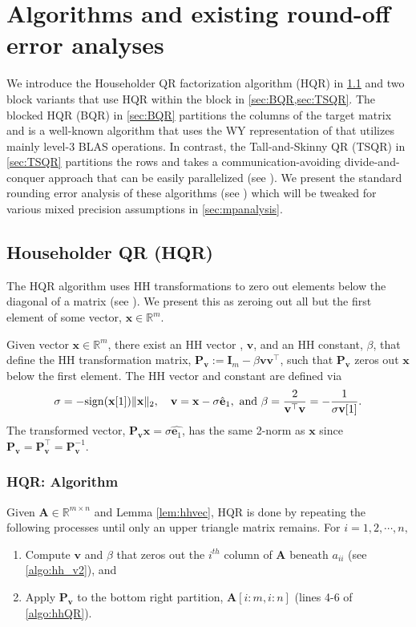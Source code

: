 \documentclass[review,onefignum,onetabnum]{siamart190516}
\newcommand{\R}{\mathbb{R}}
\newcommand{\bb}[1]{\mathbf{#1}}
\begin{document}
\section{Algorithms and existing round-off error analyses}\label{sec:algo}
%
We introduce the Householder QR factorization algorithm (HQR) in \cref{sec:HQR} and two block variants that use HQR within the block in \cref{sec:BQR,sec:TSQR}. 
The blocked HQR (BQR) in \cref{sec:BQR} partitions the columns of the target matrix and is a well-known algorithm that uses the WY representation of \cite{Bischof1987} that utilizes mainly level-3 BLAS operations.
In contrast, the Tall-and-Skinny QR (TSQR) in \cref{sec:TSQR} partitions the rows and takes a communication-avoiding divide-and-conquer approach that can be easily parallelized (see \cite{Demmel2007}).
We present the standard rounding error analysis of these algorithms (see \cite{Higham2002,Mori2012}) which will be tweaked for various mixed precision assumptions in \cref{sec:mpanalysis}.
%
\subsection{Householder QR (HQR)}\label{sec:HQR}
The HQR algorithm uses HH transformations to zero out elements below the diagonal of a matrix (see \cite{Householder1958}). 
We present this as zeroing out all but the first element of some vector, $\bb{x}\in\R^m$.
\begin{lemma}
	Given vector $\bb{x}\in\R^{m}$, there exist an HH vector , $\bb{v}$, and an HH constant, $\beta$, that define the HH transformation matrix, $\bb{P}_{\bb{v}}:=\bb{I}_{m} - \beta \bb{v}\bb{v}^{\top}$, such that $\bb{P}_{\bb{v}}$ zeros out $\bb{x}$ below the first element. 
	The HH vector and constant are defined via
	\begin{equation}
	\sigma = -\rm{sign}(\bb{x}[1])\|\bb{x}\|_2, \quad  \bb{v} = \bb{x} -\sigma \hat{\bb{e}}_{1},\mbox{ and } \beta =\frac{2}{\bb{v}^{\top}\bb{v}}=-\frac{1}{\sigma\bb{v}[1]}.
	\label{eqn:HH} 
	\vspace*{-.3cm}
	\end{equation}
	The transformed vector, $\bb{P_vx}=\sigma\hat{\bb{e}_1}$, has the same 2-norm as $\bb{x}$ since $\bb{P}_{\bb{v}}=\bb{P}_{\bb{v}}^{\top}=\bb{P}_{\bb{v}}^{-1}$.
	\label{lem:hhvec}
\end{lemma}
\subsubsection{HQR: Algorithm}
Given $\bb{A}\in\R^{m\times n}$ and Lemma \ref{lem:hhvec}, HQR is done by repeating the following processes until only an upper triangle matrix remains.
For $i = 1, 2, \cdots, n,$
\begin{enumerate}[Step 1)]
	\item Compute $\bb{v}$ and $\beta$ that zeros out the $i^{th}$ column of $\bb{A}$ beneath $a_{ii}$ (see \cref{algo:hh_v2}), and
	\item Apply $\bb{P}_{\bb{v}}$ to the bottom right partition, $\bb{A}[i:m, i:n]$ (lines 4-6 of \cref{algo:hhQR}).
\end{enumerate}
\end{document}
